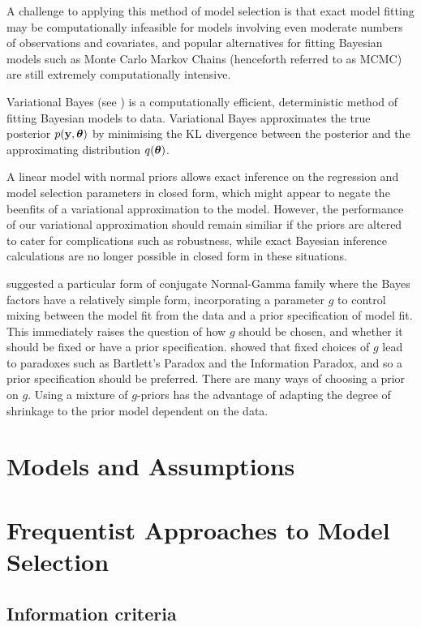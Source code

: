 A challenge to applying this method of model selection is that exact model fitting may be computationally
infeasible for models involving even moderate numbers of observations and covariates, and popular alternatives
for fitting Bayesian models such as Monte Carlo Markov Chains (henceforth referred to as MCMC) are still
extremely computationally intensive.

Variational Bayes (see \citep{Ormerod2010}) is a computationally
efficient, deterministic method of fitting Bayesian models to data. Variational Bayes approximates the true
posterior $p({\bf y}, {\boldsymbol \theta})$ by minimising the KL divergence between the posterior and the  approximating
distribution $q({\boldsymbol \theta})$.

A linear model with normal priors allows exact inference on the regression and model selection parameters in
closed form, which might appear to negate the beenfits of a variational approximation to the model. However,
the performance of our variational approximation should remain similiar if the priors are altered to cater for
complications such as robustness, while exact Bayesian inference calculations are no longer possible in closed
form in these situations.

\citep{Zellner1986} suggested a particular form of conjugate Normal-Gamma family where the Bayes factors have a
relatively simple form, incorporating a parameter $g$ to control mixing between the model fit from the data
and a prior specification of model fit. This immediately raises the question of how $g$ should be chosen, and
whether it should be fixed or have a prior specification. \citep{Liang2008} showed that fixed choices of $g$
lead to paradoxes such as Bartlett's Paradox and the Information Paradox, and so a prior specification should
be preferred. There are many ways of choosing a prior on $g$. Using a mixture of $g$-priors has the advantage
of adapting the degree of shrinkage to the prior model dependent on the data.

\section{Models and Assumptions}

\section{Frequentist Approaches to Model Selection}
\subsection{Information criteria}

